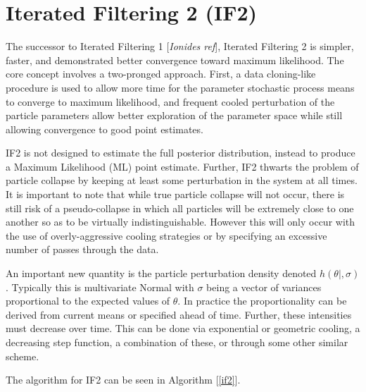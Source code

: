 \section{Iterated Filtering 2 (IF2)}

	The successor to Iterated Filtering 1 [\textit{Ionides ref}], Iterated Filtering 2 is simpler, faster, and demonstrated better convergence toward maximum likelihood. The core concept involves a two-pronged approach. First, a data cloning-like procedure is used to allow more time for the parameter stochastic process means to converge to maximum likelihood, and frequent cooled perturbation of the particle parameters allow better exploration of the parameter space while still allowing convergence to good point estimates.

	IF2 is not designed to estimate the full posterior distribution, instead to produce a Maximum Likelihood (ML) point estimate. Further, IF2 thwarts the problem of particle collapse by keeping at least some perturbation in the system at all times. It is important to note that while true particle collapse will not occur, there is still risk of a pseudo-collapse in which all particles will be extremely close to one another so as to be virtually indistinguishable. However this will only occur with the use of overly-aggressive cooling strategies or by specifying an excessive number of passes through the data.

	An important new quantity is the particle perturbation density denoted $h(\theta|,\sigma)$. Typically this is multivariate Normal with $\sigma$ being a vector of variances proportional to the expected values of $\theta$. In practice the proportionality can be derived from current means or specified ahead of time. Further, these intensities must decrease over time. This can be done via exponential or geometric cooling, a decreasing step function, a combination of these, or through some other similar scheme.

	The algorithm for IF2 can be seen in Algorithm [\ref{if2}].\\

